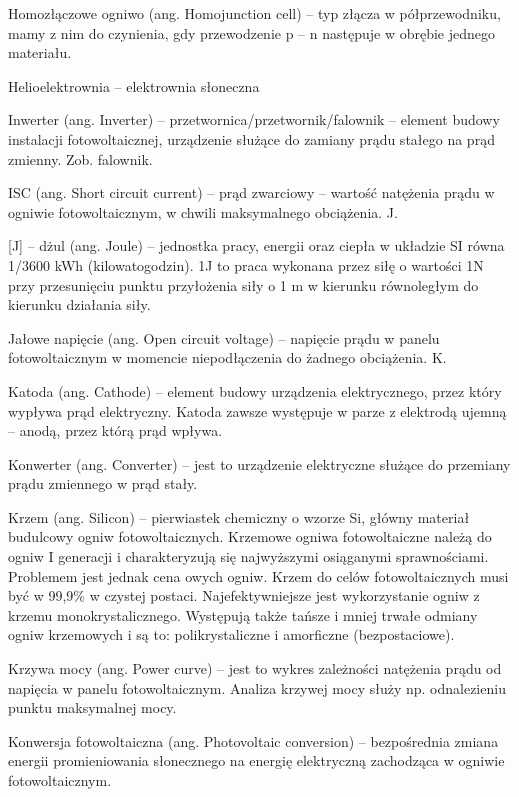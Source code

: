 \documentclass[12pt,a4paper]{article}
\begin{document}
Homozłączowe ogniwo (ang. Homojunction cell) – typ złącza w półprzewodniku, mamy z nim do czynienia, gdy przewodzenie p – n następuje w obrębie jednego materiału.

Helioelektrownia – elektrownia słoneczna


Inwerter (ang. Inverter) – przetwornica/przetwornik/falownik – element budowy instalacji fotowoltaicznej, urządzenie służące do zamiany prądu stałego na prąd zmienny. Zob. falownik.

ISC (ang. Short circuit current) – prąd zwarciowy – wartość natężenia prądu w ogniwie fotowoltaicznym, w chwili maksymalnego obciążenia.
J.

[J] – dżul (ang. Joule) – jednostka pracy, energii oraz ciepła w układzie SI równa 1/3600 kWh (kilowatogodzin). 1J to praca wykonana przez siłę o wartości 1N przy przesunięciu punktu przyłożenia siły o 1 m w kierunku równoległym do kierunku działania siły.

Jałowe napięcie (ang. Open circuit voltage) – napięcie prądu w panelu fotowoltaicznym w momencie niepodłączenia do żadnego obciążenia.
K.

Katoda (ang. Cathode) – element budowy urządzenia elektrycznego, przez który wypływa prąd elektryczny. Katoda zawsze występuje w parze z elektrodą ujemną – anodą, przez którą prąd wpływa.

Konwerter (ang. Converter) – jest to urządzenie elektryczne służące do przemiany prądu zmiennego w prąd stały.

Krzem (ang. Silicon) – pierwiastek chemiczny o wzorze Si, główny materiał budulcowy ogniw fotowoltaicznych.  Krzemowe ogniwa fotowoltaiczne należą do ogniw I generacji i charakteryzują się najwyższymi osiąganymi sprawnościami. Problemem jest jednak cena owych ogniw. Krzem do celów fotowoltaicznych musi być w 99,9\% w czystej postaci. Najefektywniejsze jest wykorzystanie ogniw z krzemu monokrystalicznego. Występują także tańsze i mniej trwałe odmiany ogniw krzemowych i są to: polikrystaliczne i amorficzne (bezpostaciowe).

Krzywa mocy (ang. Power curve) – jest to wykres zależności natężenia prądu od napięcia w panelu fotowoltaicznym. Analiza krzywej mocy służy np. odnalezieniu punktu maksymalnej mocy.

Konwersja fotowoltaiczna (ang. Photovoltaic conversion) – bezpośrednia zmiana energii promieniowania słonecznego na energię elektryczną zachodząca w ogniwie fotowoltaicznym.
\end{document}
